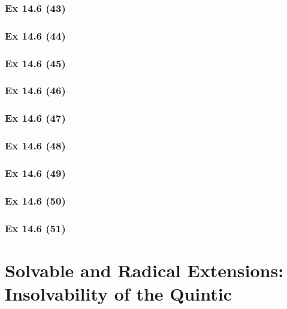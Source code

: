 \subsubsection{Ex 14.6 (43)}\label{sec:Ex_14.6.43}

\subsubsection{Ex 14.6 (44)}\label{sec:Ex_14.6.44}

\subsubsection{Ex 14.6 (45)}\label{sec:Ex_14.6.45}

\subsubsection{Ex 14.6 (46)}\label{sec:Ex_14.6.46}

\subsubsection{Ex 14.6 (47)}\label{sec:Ex_14.6.47}

\subsubsection{Ex 14.6 (48)}\label{sec:Ex_14.6.48}

\subsubsection{Ex 14.6 (49)}\label{sec:Ex_14.6.49}

\subsubsection{Ex 14.6 (50)}\label{sec:Ex_14.6.50}

\subsubsection{Ex 14.6 (51)}\label{sec:Ex_14.6.51}

\newpage		%

\section{Solvable and Radical Extensions:\\ Insolvability of the Quintic}\label{sec:14.7}	
